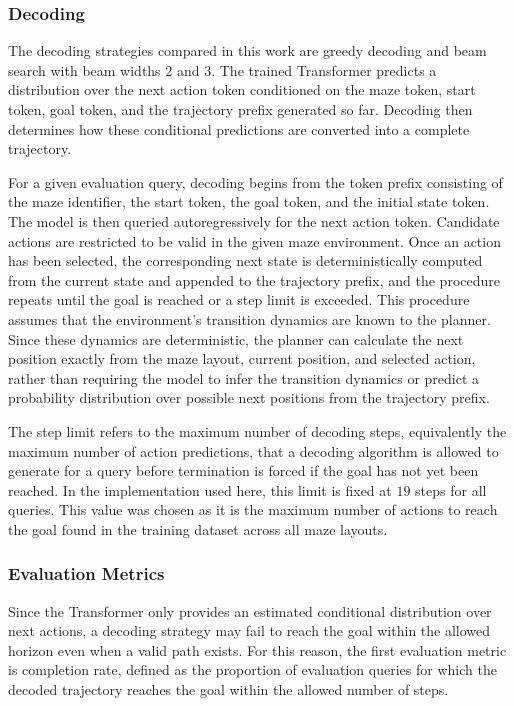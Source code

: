 ﻿\documentclass[12pt,a4paper]{article}
\theoremstyle{definition}
\begin{document}
\subsubsection{Decoding}

The decoding strategies compared in this work are greedy decoding and beam search with beam widths
$2$ and $3$. The trained Transformer predicts a distribution over the next action token conditioned
on the maze token, start token, goal token, and the trajectory prefix generated so far. Decoding
then determines how these conditional predictions are converted into a complete trajectory.

For a given evaluation query, decoding begins from the token prefix consisting of the maze
identifier, the start token, the goal token, and the initial state token. The model is
then queried autoregressively for the next action token. 
Candidate actions are restricted to be valid in the given maze environment. Once an
action has been selected, the corresponding next state is deterministically computed from the current
state and appended to the trajectory prefix, and the procedure repeats until the goal is reached or a
step limit is exceeded. This procedure assumes that the environment's transition dynamics are known to
the planner. Since these dynamics are deterministic, the planner can calculate
the next position exactly from the maze layout, current position, and selected
action, rather than requiring the model to infer the transition dynamics or
predict a probability distribution over possible next positions from the
trajectory prefix.

The step limit refers to the maximum number of decoding steps, equivalently the maximum number of 
action predictions, that a decoding algorithm is allowed to generate for a query before termination 
is forced if the goal has not yet been reached. In the implementation used here, this limit is fixed 
at $19$ steps for all queries. This value was chosen as it is the maximum number of actions to reach the 
goal found in the training dataset across all maze layouts.

\subsubsection{Evaluation Metrics}


Since the Transformer only provides an
estimated conditional distribution over next actions, a decoding strategy may fail to reach the goal
within the allowed horizon even when a valid path exists. For this reason, the first evaluation
metric is completion rate, defined as the proportion of evaluation queries for which the
decoded trajectory reaches the goal within the allowed number of steps.
\end{document}

